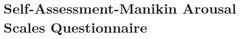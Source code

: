 \documentclass{uofsthesis-cs}
\begin{document}
\chapter{Self-Assessment-Manikin Arousal Scales Questionnaire}            \label{app:q-sam}         \noindent{}
\end{document}
